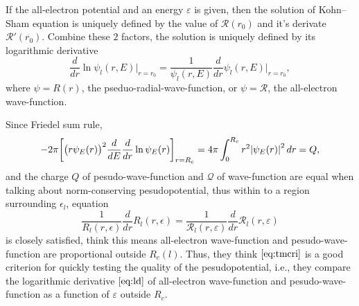 If the all-electron potential and an energy $\varepsilon$ is given,
then the solution of Kohn--Sham equation is uniquely defined by the
value of $\mathcal{R}(r_0)$ and it's derivate $\mathcal{R}'(r_0)$. Combine
these $2$ factors, the solution is uniquely defined by its  logarithmic
derivative
\begin{equation}\label{eq:ld}
	\frac{ d }{ dr } \ln \psi_l (r, E) \bigg|_{r = r_0}
	= \frac{ 1 }{ \psi_l (r, E) }
	\frac{ d }{ dr } \psi_l (r, E) \bigg|_{r = r_0},
\end{equation}
where $\psi = R(r)$, the pseduo-radial-wave-function, or
$\psi = \mathcal{R}$, the all-electron wave-function.

Since Friedel sum rule,\cite{Topp:1973cp}
\begin{equation}\label{eq:friedelsr}
	- 2\pi \bigg[ \big(r \psi_E(r) \big) ^ 2 \frac{ d }{ dE } \frac{ d }{ dr } \ln \psi_E(r) \bigg]_{ r = R_c} = 4\pi \int_{0}^{R_c} r^2 \abs{\psi_E(r)}^2 \, dr = Q,
\end{equation}
and the charge $Q$ of pesudo-wave-function and $\mathcal{Q}$ of
wave-function are equal when talking about norm-conserving pesudopotential,
thus within to a region surrounding $\epsilon_l$,
equation
\begin{equation}\label{eq:tmcri}
	\frac{ 1 }{ R_l (r, \epsilon) }
	\frac{ d }{ dr } R_l (r, \epsilon)
	=
	\frac{ 1 }{ \mathcal{R}_l (r, \varepsilon) }
	\frac{ d }{ dr } \mathcal{R}_l (r, \varepsilon)
\end{equation}
is closely satisfied,
\cite{Troullier:1991ey} think this means all-electron
wave-function and pesudo-wave-function are proportional outside $R_c(l)$.
Thus, they think $\eqref{eq:tmcri}$ is a good criterion for quickly testing
the quality of the pesudopotential, i.e., they compare the
logarithmic derivative $\eqref{eq:ld}$ of all-electron wave-function and pesudo-wave-function as a function of $\varepsilon$ outside $R_c$.

